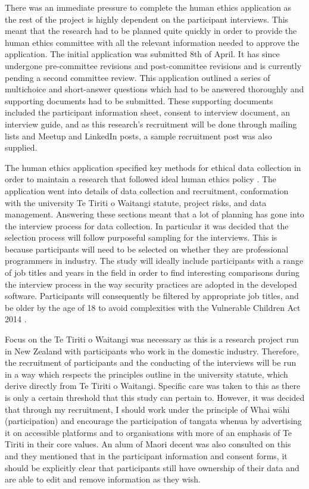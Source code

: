 \par There was an immediate pressure to complete the human ethics application as the rest of the project is highly dependent on the participant interviews. This meant that the research had to be planned quite quickly in order to provide the human ethics committee with all the relevant information needed to approve the application. The initial application was submitted 8th of April. It has since undergone pre-committee revisions and post-committee revisions and is currently pending a second committee review. This application outlined a series of multichoice and short-answer questions which had to be answered thoroughly and supporting documents had to be submitted. These supporting documents included the participant information sheet, consent to interview document, an interview guide, and as this research’s recruitment will be done through mailing lists and Meetup and LinkedIn posts, a sample recruitment post was also supplied. 
\newline
\par The human ethics application specified key methods for ethical data collection in order to maintain a research that followed ideal  human ethics policy \cite{hepol}. The application went into details of data collection and recruitment, conformation with the university Te Tiriti o Waitangi statute, project risks, and data management. Answering these sections meant that a lot of planning has gone into the interview process for data collection. In particular it was decided that the selection process will follow purposeful sampling for the interviews. This is because participants will need to be selected on whether they are professional programmers in industry. The study will ideally include participants with a range of job titles and years in the field in order to find interesting comparisons during the interview process in the way security practices are adopted in the developed software. Participants will consequently be filtered by appropriate job titles, and be older by the age of 18 to avoid complexities with the Vulnerable Children Act 2014 \cite{childact}.
\newline
\par Focus on the Te Tiriti o Waitangi was necessary as this is a research project run in New Zealand with participants who work in the domestic industry. Therefore, the recruitment of participants and the conducting of the interviews will be run in a way which respects the principles outline in the university statute, which derive directly from Te Tiriti o Waitangi. Specific care was taken to this as there is only a certain threshold that this study can pertain to. However, it was decided that through my recruitment, I should work under the principle of Whai wāhi (participation) and encourage the participation of tangata whenua by advertising it on accessible platforms and to organisations with more of an emphasis of Te Tiriti in their core values. An alum of Maori decent was also consulted on this and they mentioned that in the participant information and consent forms, it should be explicitly clear that participants still have ownership of their data and are able to edit and remove information as they wish.
